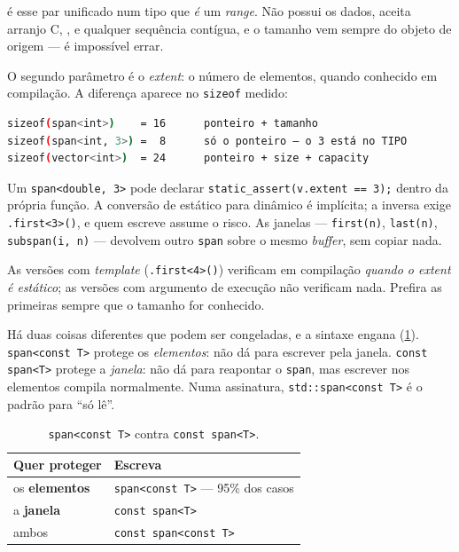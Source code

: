  é esse par unificado num tipo que \emph{é} um \emph{range}.
Não possui os dados, aceita arranjo C, ,
 e qualquer sequência contígua, e o tamanho vem sempre do
objeto de origem --- é impossível errar.

O segundo parâmetro é o \emph{extent}: o número de elementos, quando conhecido
em compilação. A diferença aparece no \texttt{sizeof} medido:

\begin{lstlisting}[style=bt, language=bash,
    caption={Saída de \texttt{src/vocabulary\_types/}: o tamanho no tipo não
             ocupa espaço no objeto.}]
sizeof(span<int>)    = 16      ponteiro + tamanho
sizeof(span<int, 3>) =  8      só o ponteiro — o 3 está no TIPO
sizeof(vector<int>)  = 24      ponteiro + size + capacity
\end{lstlisting}

Um \texttt{span<double, 3>} pode declarar \texttt{static\_assert(v.extent ==
3);} dentro da própria função. A conversão de estático para dinâmico é
implícita; a inversa exige \texttt{.first<3>()}, e quem escreve assume o risco.
As janelas --- \texttt{first(n)}, \texttt{last(n)}, \texttt{subspan(i, n)} ---
devolvem outro \texttt{span} sobre o mesmo \emph{buffer}, sem copiar nada.

\begin{armadilha}
As versões com \emph{template} (\texttt{.first<4>()}) verificam em compilação
\emph{quando o extent é estático}; as versões com argumento de execução não
verificam nada. Prefira as primeiras sempre que o tamanho for conhecido.
\end{armadilha}

Há duas coisas diferentes que podem ser congeladas, e a sintaxe engana
(\cref{tab:span-constancia}). \texttt{span<const T>} protege os
\emph{elementos}: não dá para escrever pela janela. \texttt{const span<T>}
protege a \emph{janela}: não dá para reapontar o \texttt{span}, mas escrever nos
elementos compila normalmente. Numa assinatura,
\texttt{std::span<const T>} é o padrão para ``só lê''.

\begin{table}[htbp]
\centering
\caption{\texttt{span<const T>} contra \texttt{const span<T>}.}
\label{tab:span-constancia}
\footnotesize
\begin{tabular}{@{}ll@{}}
\toprule
\textbf{Quer proteger} & \textbf{Escreva} \\
\midrule
os \textbf{elementos} & \texttt{span<const T>} --- 95\% dos casos \\
a \textbf{janela}     & \texttt{const span<T>} \\
ambos                 & \texttt{const span<const T>} \\
\bottomrule
\end{tabular}
\end{table}

